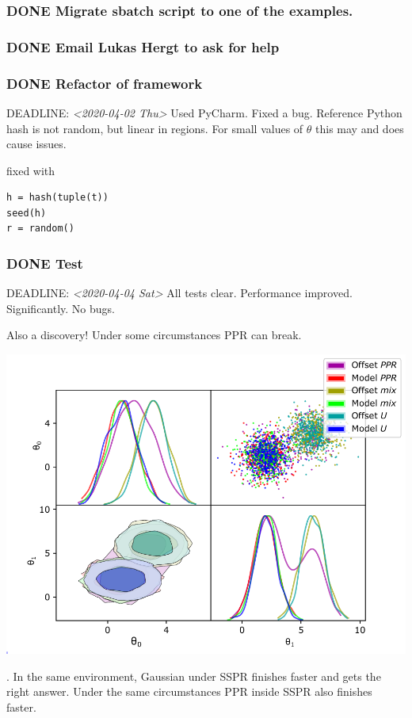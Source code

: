 \documentclass[11pt]{article}
\begin{document}
\subsubsection{{\bfseries\sffamily DONE} Migrate sbatch script to one of the examples.}
\label{sec:orgf1aa272}

\subsubsection{{\bfseries\sffamily DONE} Email Lukas Hergt to ask for help}
\label{sec:org25e16d5}

\subsubsection{{\bfseries\sffamily DONE} Refactor of framework}
\label{sec:orgaa4348f}
DEADLINE: \textit{<2020-04-02 Thu> } 
Used PyCharm. Fixed a bug. Reference
Python hash is not random, but linear in regions. For small values
of \(\theta\) this may and does cause issues. 

fixed with 

\begin{verbatim}
h = hash(tuple(t))
seed(h)
r = random()
\end{verbatim}


\subsubsection{{\bfseries\sffamily DONE} Test}
\label{sec:org4766881}
DEADLINE: \textit{<2020-04-04 Sat> } 
All tests clear. Performance improved. Significantly. No bugs. 

Also a discovery! Under some circumstances PPR can
break. \begin{center}
\includegraphics[width=.9\linewidth]{./illustrations/convergence.pdf}
\end{center}. In the same environment,
Gaussian under SSPR finishes faster and gets the right
answer. Under the same circumstances PPR inside SSPR also finishes
faster.
\end{document}
